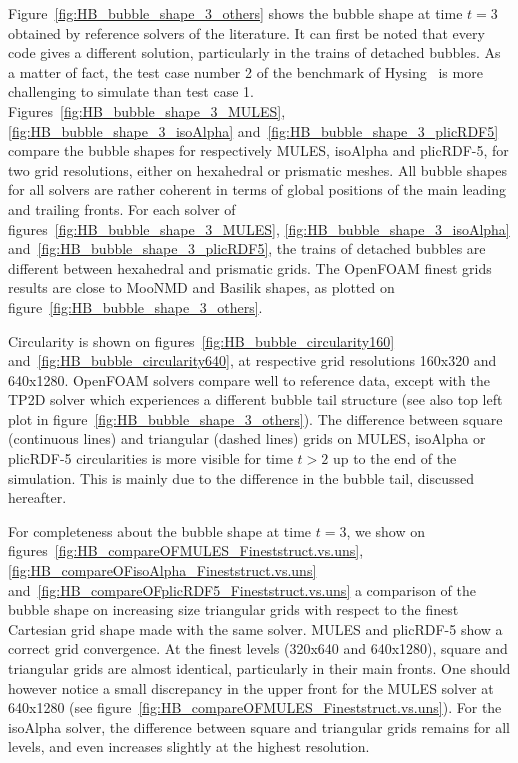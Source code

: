 \documentclass[review]{elsarticle}
\begin{document}
Figure~\ref{fig:HB_bubble_shape_3_others} shows the bubble shape at time $t=3$ obtained by reference solvers of the literature. It can first be noted that every code gives a different solution, particularly in the trains of detached bubbles. As a matter of fact, the test case number 2 of the benchmark of Hysing~\cite{Hysing2009} is more challenging to simulate than test case 1. Figures~\ref{fig:HB_bubble_shape_3_MULES}, \ref{fig:HB_bubble_shape_3_isoAlpha} and~\ref{fig:HB_bubble_shape_3_plicRDF5} compare the bubble shapes for respectively MULES, isoAlpha and plicRDF-5, for two grid resolutions, either on hexahedral or prismatic meshes. All bubble shapes for all solvers are rather coherent in terms of global positions of the main leading and trailing fronts. For each solver of figures~\ref{fig:HB_bubble_shape_3_MULES}, \ref{fig:HB_bubble_shape_3_isoAlpha} and~\ref{fig:HB_bubble_shape_3_plicRDF5}, the trains of detached bubbles are different between hexahedral and prismatic grids. The OpenFOAM finest grids results are close to MooNMD and Basilik shapes, as plotted on figure~\ref{fig:HB_bubble_shape_3_others}. 

Circularity is shown on figures~\ref{fig:HB_bubble_circularity160} and~\ref{fig:HB_bubble_circularity640}, at respective grid resolutions 160x320 and 640x1280. OpenFOAM solvers compare well to reference data, except with the TP2D solver which experiences a different bubble tail structure (see also top left plot in figure~\ref{fig:HB_bubble_shape_3_others}). The difference between square (continuous lines) and triangular (dashed lines) grids on MULES, isoAlpha or plicRDF-5 circularities is more visible for time $t>2$ up to the end of the simulation. This is mainly due to the difference in the bubble tail, discussed hereafter. 

For completeness about the bubble shape at time $t=3$, we show on figures~\ref{fig:HB_compareOFMULES_Fineststruct.vs.uns}, \ref{fig:HB_compareOFisoAlpha_Fineststruct.vs.uns} and~\ref{fig:HB_compareOFplicRDF5_Fineststruct.vs.uns} a comparison of the bubble shape on increasing size triangular grids with respect to the finest Cartesian grid shape made with the same solver. MULES and plicRDF-5 show a correct grid convergence. At the finest levels (320x640 and 640x1280), square and triangular grids are almost identical, particularly in their main fronts. One should however notice a small discrepancy in the upper front for the MULES solver at 640x1280 (see figure~\ref{fig:HB_compareOFMULES_Fineststruct.vs.uns}). For the isoAlpha solver, the difference between square and triangular grids remains for all levels, and even increases slightly at the highest resolution.
\end{document}

